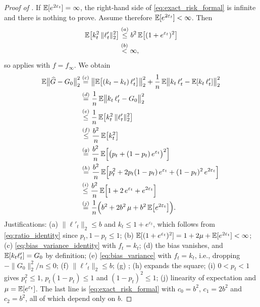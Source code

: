 \begin{proof}[Proof of ]
If $\mathbb{E}[e^{2\varepsilon_t}]=\infty$, the right-hand side of
\eqref{eq:exact_risk_formal} is infinite and there is nothing to prove. Assume
therefore $\mathbb{E}[e^{2\varepsilon_t}]<\infty$. Then
\begin{align*}
\mathbb{E}\big[k_t^2\,\|\ell'_t\|_2^2\big]
&\overset{(a)}{\le} b^2\,\mathbb{E}\big[(1+e^{\varepsilon_t})^2\big]\\
&\overset{(b)}{<} \infty ,
\end{align*}
so  applies with $f=f_\infty$. We obtain
\begin{align*}
\mathbb{E}\big\|\widehat G-G_0\big\|_2^2
&\overset{(c)}{=} \big\|\mathbb{E}\big[(k_t-k_t)\,\ell'_t\big]\big\|_2^2
+\frac1n\,\mathbb{E}\big\|k_t\,\ell'_t-\mathbb{E}[k_t\,\ell'_t]\big\|_2^2\\
&\overset{(d)}{=} \frac1n\,\mathbb{E}\big\|k_t\,\ell'_t-G_0\big\|_2^2\\
&\overset{(e)}{\le} \frac1n\,\mathbb{E}\big[k_t^2\,\|\ell'_t\|_2^2\big]\\
&\overset{(f)}{\le} \frac{b^2}{n}\,\mathbb{E}\big[k_t^2\big]\\
&\overset{(g)}{=} \frac{b^2}{n}\,\mathbb{E}\Big[\big(p_t+(1-p_t)\,e^{\varepsilon_t}\big)^2\Big]\\
&\overset{(h)}{=} \frac{b^2}{n}\,\mathbb{E}\Big[p_t^2+2p_t(1-p_t)\,e^{\varepsilon_t}
+(1-p_t)^2\,e^{2\varepsilon_t}\Big]\\
&\overset{(i)}{\le} \frac{b^2}{n}\,\mathbb{E}\Big[1+2\,e^{\varepsilon_t}+e^{2\varepsilon_t}\Big]\\
&\overset{(j)}{=} \frac{1}{n}\Big(b^2+2b^2\,\mu+b^2\,\mathbb{E}\big[e^{2\varepsilon_t}\big]\Big).
\end{align*}
Justifications: (a) $\|\ell'_t\|_2\le b$ and $k_t\le1+e^{\varepsilon_t}$,
which follows from \eqref{eq:ratio_identity} since $p_t,1-p_t\le1$;
(b) $\mathbb{E}[(1+e^{\varepsilon_t})^2]=1+2\mu+\mathbb{E}[e^{2\varepsilon_t}]<\infty$;
(c) \eqref{eq:bias_variance_identity} with $f_t=k_t$;
(d) the bias vanishes, and $\mathbb{E}[k_t\ell'_t]=G_0$ by definition;
(e) \eqref{eq:bias_variance} with $f_t=k_t$, i.e., dropping
$-\|G_0\|_2^2/n\le0$;
(f) $\|\ell'_t\|_2\le b$;
(g) ;
(h) expands the square;
(i) $0<p_t<1$ gives $p_t^2\le1$, $p_t(1-p_t)\le1$ and $(1-p_t)^2\le1$;
(j) linearity of expectation and $\mu=\mathbb{E}[e^{\varepsilon_t}]$.
The last line is \eqref{eq:exact_risk_formal} with $c_0=b^2$, $c_1=2b^2$ and
$c_2=b^2$, all of which depend only on $b$.
\end{proof}


